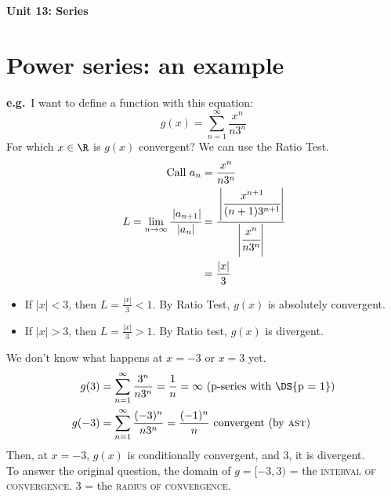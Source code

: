 

\usepackage{blindtext}
\setcounter{tocdepth}{4}
\setcounter{secnumdepth}{4}


\usepackage{subfiles}

\sectionfont{\color{blue}\selectfont}
\subsectionfont{\color{green}\selectfont}

\newcommand{\eg}{\textbf{e.g.}~}
\newcommand{\abs}[1]{\left\lvert #1 \right\rvert}
\newcommand\Ccancel[2][black]{\renewcommand\CancelColor{\color{#1}}\cancel{#2}}


\newtheorem{theorem}{Theorem}[section]
\newtheorem*{theorem*}{Theorem}
\newtheorem{definition}{Definition}[section]
{\LARGE \textbf{Unit 13: Series}}
\thispagestyle{empty}
\tableofcontents
\newpage
\clearpage
\setcounter{page}{1}
\section{Power series: an example}
\eg I want to define a function with this equation: \[g(x) = \sum_{n = 1}^{\infty} \frac{x^n}{n3^n}\]
For which \(x \in \R\) is \(g(x)\) convergent? We can use the Ratio Test.
\begin{align*}
    \text{Call } a_n                                       & = \frac{x^n}{n3^n}                                                      \\
    L = \lim_{n\to\infty} \cfrac{\abs{a_{n+1}}}{\abs{a_n}} & = \cfrac{\abs{\cfrac{x^{n+1}}{(n+1) 3^{n+1}}}}{\abs{\cfrac{x^n}{n3^n}}} \\
                                                           & = \frac{\abs{x}}{3}
\end{align*}
\begin{itemize}
    \item If \(\abs{x} < 3\), then \(L = \frac{\abs{x}}{3} < 1\). By Ratio Test, \(g(x)\) is absolutely convergent.
    \item If \(\abs{x} > 3\), then \(L = \frac{\abs{x}}{3} > 1\). By Ratio test, \(g(x)\) is divergent.
\end{itemize}
We don't know what happens at \(x = -3\) or \(x = 3\) yet. \\
\begin{align*}
    g(3)  & = \sum_{n = 1}^{\infty} \frac{3^n}{n3^n} = \frac{1}{n}  = \infty \text{ (p-series with \DS{p = 1})} \\
    g(-3) & = \sum_{n = 1}^{\infty} \frac{(-3)^n}{n3^n} = \frac{(-1)^n}{n} \text{ convergent (by \textsc{ast})} \\
\end{align*}
Then, at \(x = -3\), \(g(x)\) is conditionally convergent, and \(3\), it is divergent. \\
To answer the original question, the domain of \(g = [-3, 3)\) = the \textsc{interval of convergence}. \(3\) = the \textsc{radius of convergence}.
\newpage



